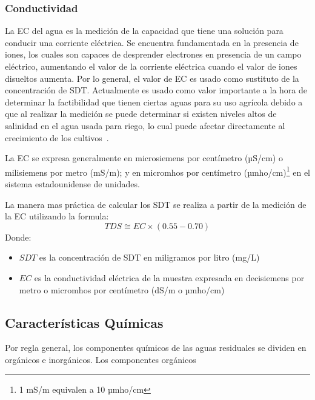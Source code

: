 \subsubsection{Conductividad}
La \gls{EC} del agua es la medición de la capacidad que tiene una solución para conducir una corriente eléctrica. Se encuentra fundamentada en la presencia de iones, los cuales son capaces de desprender electrones en presencia de un campo eléctrico, aumentando el valor de la corriente eléctrica cuando el valor de iones disueltos aumenta. Por lo general, el valor de EC es usado como sustituto de la concentración de SDT. Actualmente es usado como valor importante a la hora de determinar la factibilidad que tienen ciertas aguas para su uso agrícola debido a que al realizar la medición se puede determinar si existen niveles altos de salinidad en el agua usada para riego, lo cual puede afectar directamente al crecimiento de los cultivos~\citep{metcalf2003}.\par
La EC se expresa generalmente en microsiemens por centímetro (µS/cm) o milisiemens por metro (mS/m); y en micromhos por centímetro (µmho/cm)\footnote{1 mS/m equivalen a 10 µmho/cm} en el sistema estadounidense de unidades.\par
La manera mas práctica de calcular los \gls{SDT} se realiza a partir de la medición de la \gls{EC} utilizando la formula:
\begin{equation*}
	TDS \cong EC \times (0.55 - 0.70)
\end{equation*}
Donde:
\begin{itemize}
	\item $SDT$ es la concentración de \acrlong{SDT} en miligramos por litro (mg/L)
	\item $EC$ es la conductividad eléctrica de la muestra expresada en decisiemens por metro o micromhos por centímetro (dS/m o µmho/cm)
\end{itemize}
\subsection{Características Químicas}
Por regla general, los componentes químicos de las aguas residuales se dividen en orgánicos e inorgánicos. Los componentes orgánicos 

